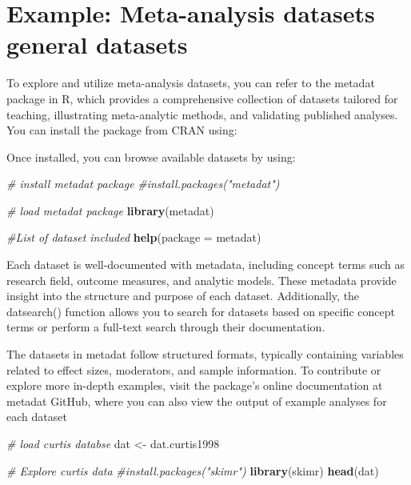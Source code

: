 \documentclass[
]{book}
\newenvironment{Shaded}{\begin{snugshade}}{\end{snugshade}}
\newcommand{\AttributeTok}[1]{\textcolor[rgb]{0.13,0.29,0.53}{#1}}
\newcommand{\CommentTok}[1]{\textcolor[rgb]{0.56,0.35,0.01}{\textit{#1}}}
\newcommand{\FunctionTok}[1]{\textcolor[rgb]{0.13,0.29,0.53}{\textbf{#1}}}
\newcommand{\NormalTok}[1]{#1}
\newcommand{\OtherTok}[1]{\textcolor[rgb]{0.56,0.35,0.01}{#1}}
\begin{document}
\section{Example: Meta-analysis datasets general datasets}\label{example-meta-analysis-datasets-general-datasets}

To explore and utilize meta-analysis datasets, you can refer to the metadat package in R, which provides a comprehensive collection of datasets tailored for teaching, illustrating meta-analytic methods, and validating published analyses.
You can install the package from CRAN using:

Once installed, you can browse available datasets by using:

\begin{Shaded}
\begin{Highlighting}[]
\CommentTok{\# install metadat package}
\CommentTok{\#install.packages("metadat")}

\CommentTok{\# load metadat package}
\FunctionTok{library}\NormalTok{(metadat)}

\CommentTok{\#List of dataset included}
\FunctionTok{help}\NormalTok{(}\AttributeTok{package =}\NormalTok{ metadat)}
\end{Highlighting}
\end{Shaded}

Each dataset is well-documented with metadata, including concept terms such as research field, outcome measures, and analytic models.
These metadata provide insight into the structure and purpose of each dataset.
Additionally, the datsearch() function allows you to search for datasets based on specific concept terms or perform a full-text search through their documentation.

The datasets in metadat follow structured formats, typically containing variables related to effect sizes, moderators, and sample information.
To contribute or explore more in-depth examples, visit the package's online documentation at metadat GitHub, where you can also view the output of example analyses for each dataset

\begin{Shaded}
\begin{Highlighting}[]
\CommentTok{\# load curtis databse}
\NormalTok{dat }\OtherTok{\textless{}{-}}\NormalTok{ dat.curtis1998}

\CommentTok{\# Explore curtis data}
\CommentTok{\#install.packages("skimr")}
\FunctionTok{library}\NormalTok{(skimr)}
\FunctionTok{head}\NormalTok{(dat)}
\end{Highlighting}
\end{Shaded}
\end{document}
